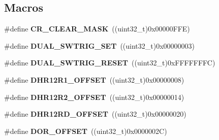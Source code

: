 \subsection*{Macros}
\begin{DoxyCompactItemize}
\item 
\hypertarget{group___d_a_c_ga8a5812a1d5ced986bb997a4bb7ae697d}{\#define {\bfseries C\-R\-\_\-\-C\-L\-E\-A\-R\-\_\-\-M\-A\-S\-K}~((uint32\-\_\-t)0x00000\-F\-F\-E)}\label{group___d_a_c_ga8a5812a1d5ced986bb997a4bb7ae697d}

\item 
\hypertarget{group___d_a_c_ga6401668f65168b2b689b49155f380bdd}{\#define {\bfseries D\-U\-A\-L\-\_\-\-S\-W\-T\-R\-I\-G\-\_\-\-S\-E\-T}~((uint32\-\_\-t)0x00000003)}\label{group___d_a_c_ga6401668f65168b2b689b49155f380bdd}

\item 
\hypertarget{group___d_a_c_gacd3ce00f8b25892532af267f26932ed7}{\#define {\bfseries D\-U\-A\-L\-\_\-\-S\-W\-T\-R\-I\-G\-\_\-\-R\-E\-S\-E\-T}~((uint32\-\_\-t)0x\-F\-F\-F\-F\-F\-F\-F\-C)}\label{group___d_a_c_gacd3ce00f8b25892532af267f26932ed7}

\item 
\hypertarget{group___d_a_c_gaf1305e3b7cfb0f898678baeab6e91cbf}{\#define {\bfseries D\-H\-R12\-R1\-\_\-\-O\-F\-F\-S\-E\-T}~((uint32\-\_\-t)0x00000008)}\label{group___d_a_c_gaf1305e3b7cfb0f898678baeab6e91cbf}

\item 
\hypertarget{group___d_a_c_ga157b0fbccea090637eea09172fdd6a39}{\#define {\bfseries D\-H\-R12\-R2\-\_\-\-O\-F\-F\-S\-E\-T}~((uint32\-\_\-t)0x00000014)}\label{group___d_a_c_ga157b0fbccea090637eea09172fdd6a39}

\item 
\hypertarget{group___d_a_c_ga2893b0491ec29a95fd061e5e0fa029e3}{\#define {\bfseries D\-H\-R12\-R\-D\-\_\-\-O\-F\-F\-S\-E\-T}~((uint32\-\_\-t)0x00000020)}\label{group___d_a_c_ga2893b0491ec29a95fd061e5e0fa029e3}

\item 
\hypertarget{group___d_a_c_ga051bab7263211bd232d13665339c1745}{\#define {\bfseries D\-O\-R\-\_\-\-O\-F\-F\-S\-E\-T}~((uint32\-\_\-t)0x0000002\-C)}\label{group___d_a_c_ga051bab7263211bd232d13665339c1745}

\end{DoxyCompactItemize}
